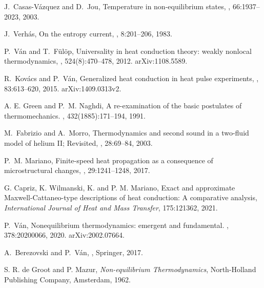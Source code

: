 \documentclass[sn-mathphys]{sn-jnl}%
\theoremstyle{thmstyleone}%
\theoremstyle{thmstyletwo}%
\theoremstyle{thmstylethree}%
\begin{document}
\begin{thebibliography}{9}
	J.~Casas-V\'azquez and D.~Jou,
	\newblock Temperature in non-equilibrium states,
	, 66:1937--2023, 2003.
	
	J.~Verh\'as,
	\newblock On the entropy current,
	, 8:201--206, 1983.
	
	P.~V\'an and T.~F\"ul\"op,
	\newblock Universality in heat conduction theory: weakly nonlocal
	thermodynamics,
	, 524(8):470--478, 2012.
	\newblock arXiv:1108.5589.
	
	R.~Kov\'acs and P.~V\'an,
	\newblock Generalized heat conduction in heat pulse experiments,
	, 83:613--620,
	2015.
	\newblock arXiv:1409.0313v2.
	
	A. E. Green and P.~M. Naghdi,
	\newblock A re-examination of the basic postulates of thermomechanics.
	, 432(1885):171--194, 1991.
	
	M.~Fabrizio and A.~Morro,
	\newblock Thermodynamics and second sound in a two-fluid model of helium {II};
	{R}evisited,
	, 28:69--84, 2003.
	
	P.~M. Mariano,
	\newblock Finite-speed heat propagation as a consequence of microstructural
	changes,
	, 29:1241–1248, 2017.
	
	G. Capriz, K. Wilmanski, K. and P. M. Mariano,
	Exact and approximate {Maxwell-C}attaneo-type descriptions of heat conduction: {A} comparative analysis,
	{\em International Journal of Heat and Mass Transfer}, 175:121362, 2021.
	
	P.~V\'an,
	\newblock Nonequilibrium thermodynamics: emergent and fundamental.
	,
	378:20200066, 2020.
	\newblock arXiv:2002.07664.
	
	A.~Berezovski and P.~V\'an,
	,
	\newblock Springer, 2017.
	
	S. R. de Groot and P. Mazur,
	{\em Non-equilibrium Thermodynamics},
	North-Holland Publishing Company, Amsterdam, 1962.
	

\end{thebibliography}
\end{document}
